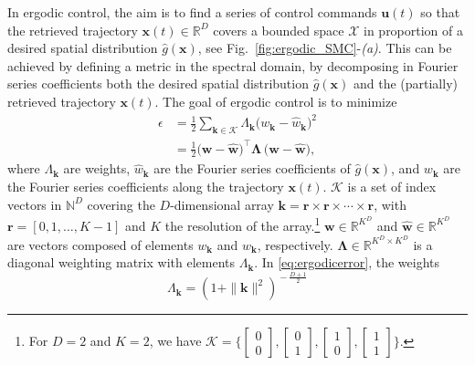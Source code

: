 \documentclass[10pt,a4paper]{article} %
\newcommand{\trsp}{{\scriptscriptstyle\top}}
\begin{document}
In ergodic control, the aim is to find a series of control commands $\bm{u}(t)$ so that the retrieved trajectory $\bm{x}(t)\in\mathbb{R}^D$ covers a bounded space $\mathcal{X}$ in proportion of a desired spatial distribution $\hat{g}(\bm{x})$, see Fig.~\ref{fig:ergodic_SMC}-\emph{(a)}. This can be achieved by defining a metric in the spectral domain, by decomposing in Fourier series coefficients both the desired spatial distribution $\hat{g}(\bm{x})$ and the (partially) retrieved trajectory $\bm{x}(t)$.
The goal of ergodic control is to minimize
\begin{align}
	\epsilon &= \frac{1}{2} \sum_{{\bm{k}}\in\mathcal{K}} \Lambda_{\bm{k}} \Big( w_{\bm{k}} - \hat{w}_{\bm{k}} \Big)^{\!2} \label{eq:ergodicerror}\\
	&= \frac{1}{2} {\Big( \bm{w} - \bm{\hat{w}} \Big)}^{\!\trsp} \bm{\Lambda} \, \Big( \bm{w} - \bm{\hat{w}} \Big),
\end{align}
where $\Lambda_{\bm{k}}$ are weights, $\hat{w}_{\bm{k}}$ are the Fourier series coefficients of $\hat{g}(\bm{x})$, and $w_{\bm{k}}$ are the Fourier series coefficients along the trajectory $\bm{x}(t)$. $\mathcal{K}$ is a set of index vectors in $\mathbb{N}^D$ covering the $D$-dimensional array $\bm{k}=\bm{r}\times\bm{r}\times\cdots\times\bm{r}$, with $\bm{r}=[0,1,\ldots,K\!-\!1]$ and $K$ the resolution of the array.\footnote{For $D=2$ and $K=2$, we have $\mathcal{K}=\big\{\left[\begin{smallmatrix}0\\0\end{smallmatrix}\right],\left[\begin{smallmatrix}0\\1\end{smallmatrix}\right],\left[\begin{smallmatrix}1\\0\end{smallmatrix}\right],\left[\begin{smallmatrix}1\\1\end{smallmatrix}\right]\big\}$.}
$\bm{w}\in\mathbb{R}^{K^D}$ and $\bm{\hat{w}}\in\mathbb{R}^{K^D}$ are vectors composed of elements $w_{\bm{k}}$ and $\hat{w}_{\bm{k}}$, respectively. $\bm{\Lambda}\in\mathbb{R}^{K^D\times K^D}$ is a diagonal weighting matrix with elements $\Lambda_{\bm{k}}$.
In \eqref{eq:ergodicerror}, the weights
\begin{equation}
	\Lambda_{\bm{k}} = \left(1+ \|\bm{k}\|^2\right)^{\!-\frac{D+1}{2}}
\end{equation}
\end{document}
